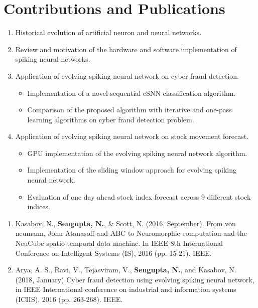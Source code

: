 \pagebreak
\section{Contributions and Publications}
\begin{tcolorbox}[colback=black!5,colframe=black!40!black,title=Contributions]
	\begin{enumerate}
		\item Historical evolution of artificial neuron and neural networks.
		\item Review and motivation of the hardware and software implementation of spiking neural networks.
		\item Application of evolving spiking neural network on cyber fraud detection.
		\begin{itemize}
			\item Implementation of a novel sequential eSNN classification algorithm.
			\item Comparison of the proposed algorithm with iterative and one-pass learning algorithms on cyber fraud detection problem. 
		\end{itemize}
		\item Application of evolving spiking neural network on stock movement forecast.
		\begin{itemize}
			\item GPU implementation of the evolving spiking neural network algorithm.
			\item Implementation of the sliding window approach for evolving spiking neural network.
			\item Evaluation of one day ahead stock index forecast across $9$ different stock indices. 
		\end{itemize}
	\end{enumerate}
\end{tcolorbox}

\begin{tcolorbox}[colback=black!5,colframe=black!40!black,title=Publications]
	\begin{enumerate}
		\item Kasabov, N., \textbf{Sengupta, N.}, \& Scott, N. (2016, September). From von neumann, John Atanasoff and ABC to Neuromorphic computation and the NeuCube spatio-temporal data machine. In IEEE 8th International Conference on Intelligent Systems (IS), 2016  (pp. 15-21). IEEE.
		\item Arya, A. S., Ravi, V., Tejasviram, V., \textbf{Sengupta, N.}, and Kasabov, N. (2018, January) Cyber fraud detection using evolving spiking neural network, in IEEE International conference on industrial and information systems (ICIIS), 2016 (pp. 263-268). IEEE.
	\end{enumerate}
\end{tcolorbox}






  

